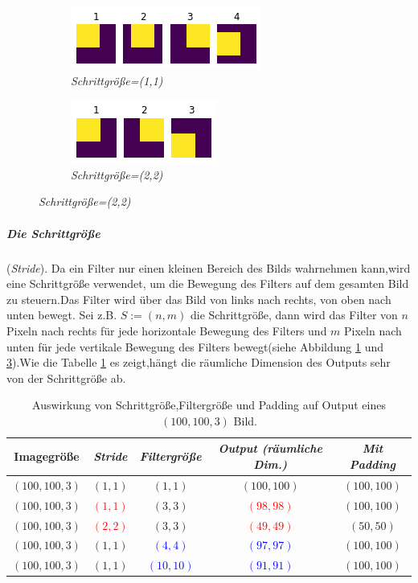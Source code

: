 \documentclass[12pt,a4paper]{scrartcl}
\numberwithin{equation}{section}
\begin{document}
	\begin{figure}[h!]
		\centering
		\caption{Einfluss der Schrittgröße auf die Größe der Feature-Maps}
		\begin{subfigure}{.5\textwidth}
			\centering
			\includegraphics{stride1}
			\caption{\emph{Schrittgröße=(1,1) } }
			\label{fig:stride1}
		\end{subfigure}%
		\begin{subfigure}{.5\textwidth}
			\centering
			\includegraphics{stride2}
			\caption{ \emph{Schrittgröße=(2,2) } }
			\label{fig:stride2}
		\end{subfigure}
	\end{figure}
\subparagraph{Die Schrittgröße} (\textit{Stride}). 	Da ein Filter nur einen kleinen Bereich des Bilds wahrnehmen kann,wird eine Schrittgröße verwendet, um die Bewegung des Filters auf dem gesamten Bild zu steuern.Das Filter wird über das Bild von links nach rechts, von oben nach unten bewegt. Sei z.B. $ S:=(n,m) $  die Schrittgröße, dann wird das Filter von $ n $ Pixeln nach rechts für jede horizontale Bewegung des Filters und $ m $ Pixeln nach unten für jede vertikale Bewegung des Filters bewegt(siehe Abbildung \ref{fig:stride1} und \ref{fig:stride2}).Wie die Tabelle \ref{tab:Stride and filter size} es zeigt,hängt die räumliche Dimension des Outputs sehr von der Schrittgröße ab.
	
	\begin{table}[h!]
		\centering
		\begin{tabular}{|c|c|c|c|c|}
			\hline
			\textbf{Imagegröße} & \textbf{\emph{Stride}} & \textbf{\emph{Filtergröße}} & \textbf{\textit{Output (räumliche Dim.)}}&\textbf{\emph{Mit Padding}}\\ \hline
			$ (100, 100, 3) $ &{$ (1,1) $ }& $ (1,1) $ &{$ (100,100) $ }&$ (100,100) $ \\ \hline
			$ (100, 100, 3) $ &\textcolor{red}{$ (1,1) $ }& $ (3,3) $ &\textcolor{red}{$ (98,98) $ }&$ (100,100) $ \\ \hline
			$ (100, 100, 3) $ &\textcolor{red}{$ (2, 2) $ } & $ (3,3) $ &\textcolor{red}{$ (49,49) $ }&$ (50,50) $ \\ \hline
			$ (100, 100, 3) $ &$ (1,1) $ & \textcolor{blue}{$ (4,4) $ }&\textcolor{blue}{$ (97, 97) $ } & $ (100, 100) $\\ \hline
			$ (100, 100, 3) $ &$ (1,1) $ & \textcolor{blue}{$ (10,10) $ }&\textcolor{blue}{$ (91, 91) $ } &$ (100, 100) $\\ \hline
		\end{tabular}
		\caption{Auswirkung von Schrittgröße,Filtergröße und Padding auf Output eines $ (100, 100, 3) $ Bild.}
		\label{tab:Stride and filter size}
	\end{table}
	
\end{document}
